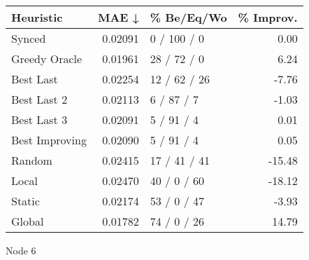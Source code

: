 \begin{tabular}{lrlr}
\toprule
\textbf{Heuristic} & \textbf{MAE ↓} & \textbf{\% Be/Eq/Wo} & \textbf{\% Improv.} \\
\midrule
            Synced &        0.02091 &          0 / 100 / 0 &                0.00 \\
     Greedy Oracle &        0.01961 &          28 / 72 / 0 &                6.24 \\
         Best Last &        0.02254 &         12 / 62 / 26 &               -7.76 \\
       Best Last 2 &        0.02113 &           6 / 87 / 7 &               -1.03 \\
       Best Last 3 &        0.02091 &           5 / 91 / 4 &                0.01 \\
    Best Improving &        0.02090 &           5 / 91 / 4 &                0.05 \\
            Random &        0.02415 &         17 / 41 / 41 &              -15.48 \\
             Local &        0.02470 &          40 / 0 / 60 &              -18.12 \\
            Static &        0.02174 &          53 / 0 / 47 &               -3.93 \\
            Global &        0.01782 &          74 / 0 / 26 &               14.79 \\
\bottomrule
\end{tabular}
\caption{Node 6}
\label{tab:non_lr05_le1_bs2_6}
